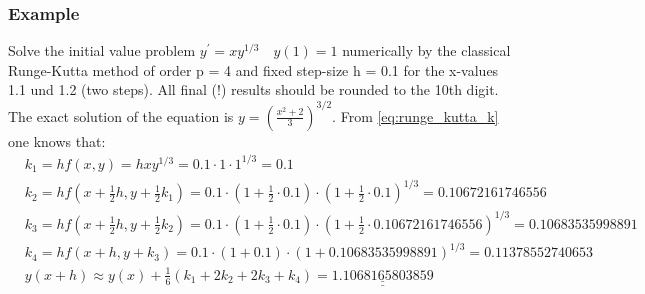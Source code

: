 \subsubsection{Example}
Solve the initial value problem $y^{\prime}=x y^{1 / 3} \quad y(1)=1$ numerically by the classical Runge-Kutta method of order p = 4 and fixed step-size h = 0.1 for the x-values 1.1 und 1.2 (two steps). All final (!) results should be rounded to the 10th digit. The exact solution of the equation is $y=\left(\frac{x^2+2}{3}\right)^{3 / 2}$.\newline
From \autoref{eq:runge_kutta_k} one knows that:
$$
\begin{aligned}
& k_1=h f(x, y)=h x y^{1 / 3} = 0.1\cdot 1 \cdot 1^{1/3}=0.1 \\
& k_2=h f\left(x+\frac{1}{2} h, y+\frac{1}{2} k_1\right)=0.1\cdot (1+\frac{1}{2}\cdot 0.1)\cdot (1+\frac{1}{2}\cdot 0.1)^{1/3}=0.10672161746556 \\
& k_3=h f\left(x+\frac{1}{2} h, y+\frac{1}{2} k_2\right)= 0.1\cdot (1+\frac{1}{2}\cdot 0.1)\cdot (1+\frac{1}{2}\cdot 0.10672161746556)^{1/3}=0.10683535998891 \\
& k_4=h f\left(x+h, y+k_3\right)=0.1 \cdot (1+0.1)\cdot (1+0.10683535998891)^{1/3}=0.11378552740653 \\
& y(x+h) \approx y(x)+\frac{1}{6}\left(k_1+2 k_2+2 k_3+k_4\right)=\underline{\underline{1.1068165803859}}
\end{aligned}
$$

